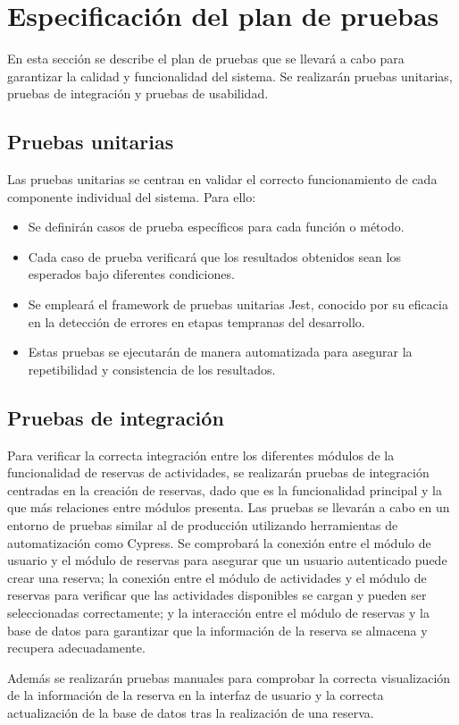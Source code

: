 \section{Especificación del plan de pruebas}
En esta sección se describe el plan de pruebas que se llevará a cabo para garantizar la calidad y funcionalidad del sistema. Se realizarán pruebas unitarias, pruebas de integración y pruebas de usabilidad.
\subsection{Pruebas unitarias}
Las pruebas unitarias se centran en validar el correcto funcionamiento de cada componente individual del sistema. Para ello:
\begin{itemize}
	\item Se definirán casos de prueba específicos para cada función o método.
	\item Cada caso de prueba verificará que los resultados obtenidos sean los esperados bajo diferentes condiciones.
	\item Se empleará el framework de pruebas unitarias Jest, conocido por su eficacia en la detección de errores en etapas tempranas del desarrollo.
	\item Estas pruebas se ejecutarán de manera automatizada para asegurar la repetibilidad y consistencia de los resultados.
\end{itemize}
\subsection{Pruebas de integración}
Para verificar la correcta integración entre los diferentes módulos de la funcionalidad de reservas de actividades, se realizarán pruebas de integración centradas en la creación de reservas, dado que es la funcionalidad principal y la que más relaciones entre módulos presenta.
Las pruebas se llevarán a cabo en un entorno de pruebas similar al de producción utilizando herramientas de automatización como Cypress.
Se comprobará la conexión entre el módulo de usuario y el módulo de reservas para asegurar que un usuario autenticado puede crear una reserva;
la conexión entre el módulo de actividades y el módulo de reservas para verificar que las actividades disponibles se cargan y pueden ser seleccionadas correctamente;
y la interacción entre el módulo de reservas y la base de datos para garantizar que la información de la reserva se almacena y recupera adecuadamente.

Además se realizarán pruebas manuales para comprobar la correcta visualización de la información de la reserva en la interfaz de usuario y la correcta actualización de la base de datos tras la realización de una reserva.
